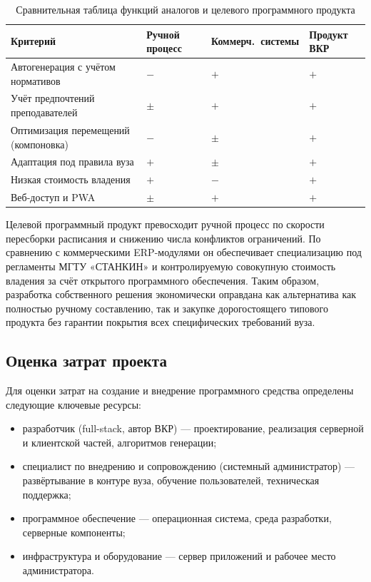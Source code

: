 \begin{table}[H]
	\centering
	\caption{Сравнительная таблица функций аналогов и целевого программного продукта}
	\label{tab:analogs}
	\begin{tabularx}{\textwidth}{|>{\raggedright\arraybackslash}X|>{\centering\arraybackslash}p{2.3cm}|>{\centering\arraybackslash}p{2.5cm}|>{\centering\arraybackslash}p{2.5cm}|}
		\hline
		\textbf{Критерий} &
		\textbf{Ручной процесс} &
		\textbf{Коммерч.\ системы} &
		\textbf{Продукт ВКР} \\
		\hline
		Автогенерация с учётом нормативов & $-$ & $+$ & $+$ \\
		\hline
		Учёт предпочтений преподавателей & $\pm$ & $+$ & $+$ \\
		\hline
		Оптимизация перемещений (компоновка) & $-$ & $\pm$ & $+$ \\
		\hline
		Адаптация под правила вуза & $+$ & $\pm$ & $+$ \\
		\hline
		Низкая стоимость владения & $+$ & $-$ & $+$ \\
		\hline
		Веб-доступ и PWA & $\pm$ & $+$ & $+$ \\
		\hline
	\end{tabularx}
\end{table}

Целевой программный продукт превосходит ручной процесс по скорости пересборки расписания и снижению числа конфликтов ограничений. По сравнению с коммерческими ERP-модулями он обеспечивает специализацию под регламенты МГТУ «СТАНКИН» и контролируемую совокупную стоимость владения за счёт открытого программного обеспечения. Таким образом, разработка собственного решения экономически оправдана как альтернатива как полностью ручному составлению, так и закупке дорогостоящего типового продукта без гарантии покрытия всех специфических требований вуза.

\subsection{Оценка затрат проекта}

Для оценки затрат на создание и внедрение программного средства определены следующие ключевые ресурсы:

\begin{itemize}
	\item разработчик (full-stack, автор ВКР) --- проектирование, реализация серверной и клиентской частей, алгоритмов генерации;
	\item специалист по внедрению и сопровождению (системный администратор) --- развёртывание в контуре вуза, обучение пользователей, техническая поддержка;
	\item программное обеспечение --- операционная система, среда разработки, серверные компоненты;
	\item инфраструктура и оборудование --- сервер приложений и рабочее место администратора.
\end{itemize}

